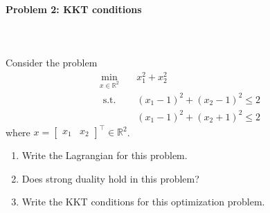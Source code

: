 \documentclass[a4paper]{ctexart}
\begin{document}
\paragraph{Problem 2: KKT conditions}
~\\
~\\
Consider the problem
\begin{align*}
    \min _{x \in \mathbb{R}^{2}} \quad & x_{1}^{2}+x_{2}^{2}                                      \\
    \text { s.t. } \quad               & \left(x_{1}-1\right)^{2}+\left(x_{2}-1\right)^{2} \leq 2 \\
                                       & \left(x_{1}-1\right)^{2}+\left(x_{2}+1\right)^{2} \leq 2
\end{align*}
where $x=\left[\begin{array}{ll}x_{1} & x_{2}\end{array}\right]^{\top} \in \mathbb{R}^{2}$. \\
\begin{enumerate}[(1)]
    \item Write the Lagrangian for this problem.
    \item Does strong duality hold in this problem?
    \item Write the KKT conditions for this optimization problem.
\end{enumerate}
\end{document}
